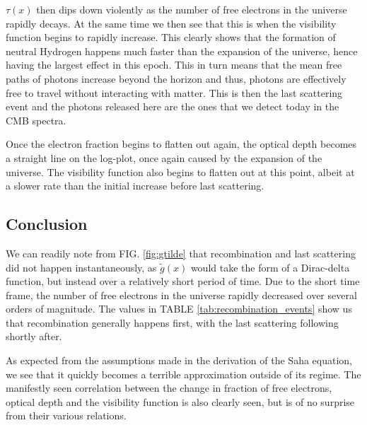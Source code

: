 \documentclass[%
reprint,
 amsmath,amssymb,
 aps,
]{revtex4-2}
\begin{document}
$\tau(x)$ then dips down violently as the number of free electrons in the universe rapidly decays. At the same time we then see that this is when the visibility function begins to rapidly increase. This  clearly shows that the formation of neutral Hydrogen happens much faster than the expansion of the universe, hence having the largest effect in this epoch. This in turn means that the mean free paths of photons increase beyond the horizon and thus, photons are effectively free to travel without interacting with matter. This is then the last scattering event and the photons released here are the ones that we detect today in the CMB spectra. 

Once the electron fraction begins to flatten out again, the optical depth becomes a straight line on the log-plot, once again caused by the expansion of the universe. The visibility function also begins to flatten out at this point, albeit at a slower rate than the initial increase before last scattering. 


\subsection{Conclusion}
We can readily note from FIG. \ref{fig:gtilde} that recombination and last scattering did not happen instantaneously, as $\tilde g(x)$ would take the form of a Dirac-delta function, but instead over a relatively short period of time. Due to the short time frame, the number of free electrons in the universe rapidly decreased over several orders of magnitude. The values in TABLE \ref{tab:recombination_events} show us that recombination generally happens first, with the last scattering following shortly after.

As expected from the assumptions made in the derivation of the Saha equation, we see that it quickly becomes a terrible approximation outside of its regime. The manifestly seen correlation between the change in fraction of free electrons, optical depth and the visibility function is also clearly seen, but is of no surprise from their various relations.
\end{document}
